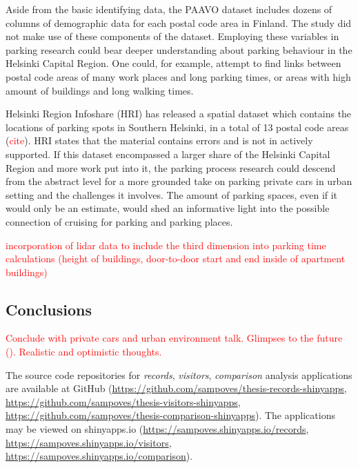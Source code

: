 Aside from the basic identifying data, the PAAVO dataset includes dozens of columns of demographic data for each postal code area in Finland. The study did not make use of these components of the dataset. Employing these variables in parking research could bear deeper understanding about parking behaviour in the Helsinki Capital Region. One could, for example, attempt to find links between postal code areas of many work places and long parking times, or areas with high amount of buildings and long walking times.

Helsinki Region Infoshare (HRI) has released a spatial dataset which contains the locations of parking spots in Southern Helsinki, in a total of 13 postal code areas (\textcolor{red}{cite}). HRI states that the material contains errors and is not in actively supported. If this dataset encompassed a larger share of the Helsinki Capital Region and more work put into it, the parking process research could descend from the abstract level for a more grounded take on parking private cars in urban setting and the challenges it involves. The amount of parking spaces, even if it would only be an estimate, would shed an informative light into the possible connection of cruising for parking and parking places.

\textcolor{red}{incorporation of lidar data to include the third dimension into parking time calculations (height of buildings, door-to-door start and end inside of apartment buildings)}

\newpage
\subsection{Conclusions}
\justify


\textcolor{red}{Conclude with private cars and urban environment talk. Glimpses to the future (\cite{ElinaBrandtMatleenaLindeqvist2016}). Realistic and optimistic thoughts.}

The source code repositories for \textit{records}, \textit{visitors}, \textit{comparison} analysis applications are available at GitHub (\textcolor{blue}{\url{https://github.com/sampoves/thesis-records-shinyapps}}, \textcolor{blue}{\url{https://github.com/sampoves/thesis-visitors-shinyapps}}, \textcolor{blue}{\url{https://github.com/sampoves/thesis-comparison-shinyapps}}). The applications may be viewed on shinyapps.io (\textcolor{blue}{\url{https://sampoves.shinyapps.io/records}}, \textcolor{blue}{\url{https://sampoves.shinyapps.io/visitors}}, \textcolor{blue}{\url{https://sampoves.shinyapps.io/comparison}}).